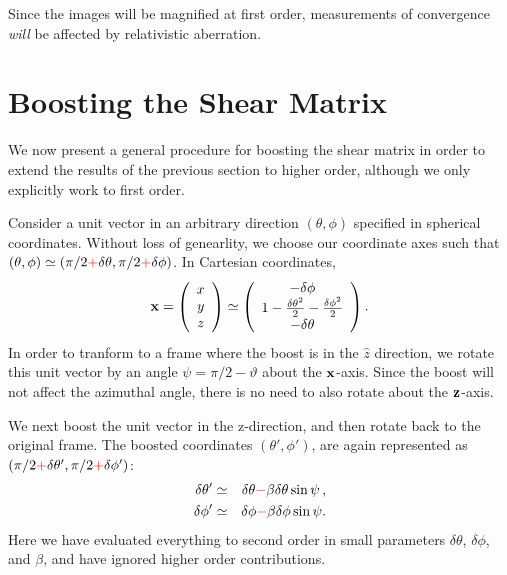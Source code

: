 \documentclass[useAMS,fleqn,usenatbib]{mn2e}
\begin{document}
Since the images will be magnified at first order, measurements
of convergence {\it will} be affected by relativistic aberration.



\section{Boosting the Shear Matrix}
\label{shear}

We now present a general procedure for boosting the shear matrix in order to extend the results of the previous section to higher order, although we only explicitly work to first order.

Consider a unit vector  in an arbitrary direction $(\theta,\phi)$ specified in spherical coordinates.  Without loss of genearlity, we choose our coordinate axes such that 
$(\theta,\phi)\simeq(\pi/2{\color{red}+}\delta\theta,\pi/2{\color{red}+}\delta\phi)$.   In Cartesian coordinates,
\begin{equation}
{\bf x}=\left(\begin{array}{c}
x\\
y\\
z
\end{array}\right)\simeq\left(\begin{array}{c}
-\delta\phi\\
1-\frac{\delta\theta^{2}}{2}-\frac{\delta\phi^{2}}{2}\\
-\delta\theta
\end{array}\right).
\end{equation}
In order to tranform to a frame where the boost is in the $\hat z$ direction, we rotate this unit vector {\color{red}by an angle $\psi = \pi/2-\vartheta$} about the ${\bf x}$-axis. Since the boost will not affect the azimuthal angle, there is no need to also rotate about the ${\bf z}$-axis.

We next boost the unit vector in the z-direction, and then rotate back to the original frame.
The boosted coordinates $(\theta',\phi')$, are
again represented as
 $(\pi/2{\color{red}+}\delta\theta',\pi/2{\color{red}+}\delta\phi')$:
\begin{eqnarray}
\delta\theta' & \simeq &\delta\theta{\color{red}-}\beta\delta\theta\sin\psi\,,\\
\delta\phi' & \simeq & \delta\phi{\color{red}-}\beta\delta\phi\sin\psi.
\end{eqnarray}
Here we have evaluated everything to second order in small parameters
$\delta\theta$, $\delta\phi$, and $\beta$, and have ignored higher order contributions.
\end{document}

